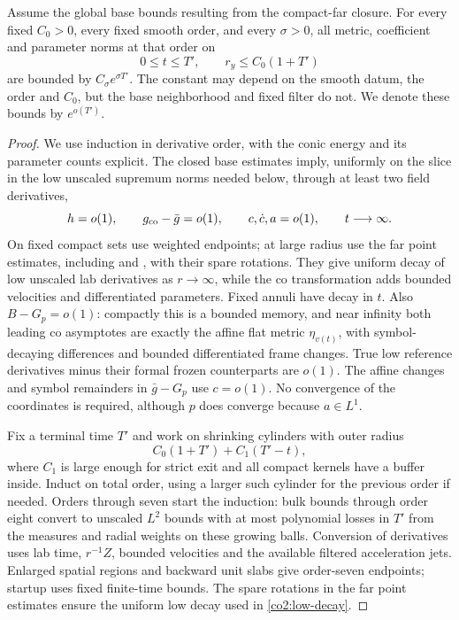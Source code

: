 \begin{proposition}\label{co2:higher}
Assume the global base bounds resulting from the compact-far closure.  For
every fixed $C_0>0$, every fixed smooth order, and every $\sigma>0$, all
metric, coefficient and parameter norms at that order on
\[
 0\le t\le T',\qquad r_y\le C_0(1+T')
\]
are bounded by $C_\sigma e^{\sigma T'}$.  The constant may depend on the
smooth datum, the order and $C_0$, but the base neighborhood and fixed filter
do not.  We denote these bounds by $e^{o(T')}$.
\end{proposition}

\begin{proof}
We use induction in derivative order, with the conic energy and its
parameter counts explicit.  The closed base estimates imply, uniformly on
the slice in the low unscaled supremum norms needed below, through at least
two field derivatives,
\begin{equation}\label{co2:low-decay}
 h=o(1),\qquad g_{\rm co}-\bar g=o(1),\qquad
 c,\dot c,a=o(1),\qquad t\longrightarrow\infty.
\end{equation}
On fixed compact sets use weighted endpoints; at large radius use the far
point estimates, including  and , with their spare
rotations.  They give uniform decay of low unscaled lab derivatives as
$r\to\infty$, while the co transformation adds bounded velocities and
differentiated parameters.  Fixed annuli have decay in $t$.  Also
$B-G_p=o(1)$: compactly this is a bounded memory, and near infinity both
leading co asymptotes are exactly the affine flat metric $\eta_{v(t)}$,
with symbol-decaying differences and bounded differentiated frame changes.
True low reference derivatives minus their formal frozen counterparts are
$o(1)$.  The affine changes and symbol remainders in $\bar g-G_p$ use
$c=o(1)$.  No convergence of the coordinates is required, although $p$
does converge because $a\in L^1$.

Fix a terminal time $T'$ and work on shrinking cylinders with outer radius
\begin{equation}\label{co2:higher-cylinder}
 C_0(1+T')+C_1(T'-t),
\end{equation}
where $C_1$ is large enough for strict exit and all compact kernels have a
buffer inside.  Induct on total order, using a larger such cylinder for the
previous order if needed.  Orders through seven start the induction: bulk
bounds through order eight convert to unscaled $L^2$ bounds with at most
polynomial losses in $T'$ from the measures and radial weights on these
growing balls.  Conversion of derivatives uses lab time, $r^{-1}Z$, bounded
velocities and the available filtered acceleration jets.  Enlarged spatial
regions and backward unit slabs give order-seven endpoints; startup uses
fixed finite-time bounds.  The spare rotations in the far point estimates
ensure the uniform low decay used in \eqref{co2:low-decay}.


\end{proof}
